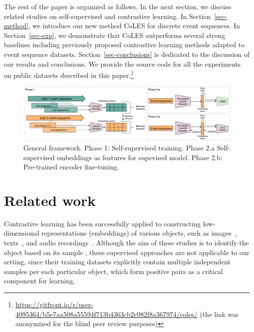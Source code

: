 \documentclass[sigconf, anonymous]{acmart}
\begin{document}
The rest of the paper is organized as follows. In the next section, we discuss related studies
on self-supervised and contrastive learning. In Section~\ref{sec-method}, we introduce our new
method CoLES for discrete event sequences. In Section~\ref{sec-exp}, we demonstrate that CoLES
outperforms several strong baselines including previously proposed contrastive learning methods
adapted to event sequence datasets. Section~\ref{sec-conclusions} is dedicated to the discussion
of our results and conclusions.
% 
We provide the source code for all the experiments on public datasets described in this paper.\footnote{
    \url{https://gitfront.io/r/user-4095364/b5e7aa508a55594f713b4363cb2e982f8a367974/coles/}
    (the link was anonymized for the blind peer review purposes)
}

\begin{figure}[htbp]
  \includegraphics[width=\linewidth]{figures/CoLES.pdf}
    \caption{
        General framework.
        Phase 1: Self-supervised training.
        Phase 2.a Self-supervised embeddings as features for supevised model.
        Phase 2.b: Pre-trained encoder fine-tuning.
    }
  \label{fig-arch}
\end{figure}

\section{Related work} \label{sec-rel-work}

Contrastive learning has been successfully applied to constructing low-dimensional representations
(embeddings) of various objects, such as images~\citep{Chopra2005LearningAS,Schroff2015FaceNetAU},
texts~\citep{Reimers2019SentenceBERTSE}, and audio recordings~\citep{Wan2018GeneralizedEL}.
Although the aim of these studies is to identify the object based on its sample
\citep{Schroff2015FaceNetAU,Hu2014DiscriminativeDM,Wan2018GeneralizedEL}, these supervised
approaches are not applicable to our setting, since their training datasets explicitly contain
multiple independent samples per each particular object, which form positive pairs as
a critical component for learning. 
\end{document}
